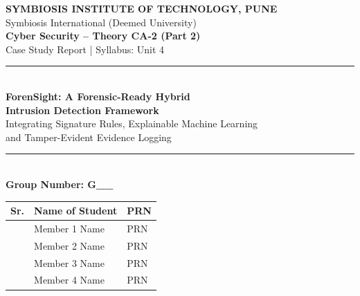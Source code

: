 \documentclass[12pt,a4paper,oneside]{article}
\newcommand{\groupno}{G\_\_}            %
\newcommand{\memberA}{Member 1 Name}    \newcommand{\prnA}{PRN}
\newcommand{\memberB}{Member 2 Name}    \newcommand{\prnB}{PRN}
\newcommand{\memberC}{Member 3 Name}    \newcommand{\prnC}{PRN}
\newcommand{\memberD}{Member 4 Name}    \newcommand{\prnD}{PRN}
\begin{document}
\begin{titlepage}
\thispagestyle{empty}
\begin{tcolorbox}[enhanced,colback=white,colframe=rblue,boxrule=1.6pt,arc=0pt,height=\textheight,valign=top,left=14pt,right=14pt,top=10pt]
\centering
{\large\bfseries\color{rblue} SYMBIOSIS INSTITUTE OF TECHNOLOGY, PUNE}\\[2pt]
{\normalsize Symbiosis International (Deemed University)}\\[14pt]
{\large\bfseries Cyber Security -- Theory CA-2 (Part 2)}\\[2pt]
{\normalsize Case Study Report \;|\; Syllabus: Unit 4}\\[16pt]
{\color{rblue}\rule{0.9\linewidth}{1pt}}\\[10pt]
{\LARGE\bfseries\color{rblue} ForenSight: A Forensic-Ready Hybrid\\[4pt] Intrusion Detection Framework}\\[10pt]
{\large Integrating Signature Rules, Explainable Machine Learning\\ and Tamper-Evident Evidence Logging}\\[10pt]
{\color{rblue}\rule{0.9\linewidth}{1pt}}\\[18pt]

{\Large\bfseries Group Number: \color{rblue}\groupno}\\[16pt]

\begin{tabular}{>{\centering\arraybackslash}p{1.2cm} >{\raggedright\arraybackslash}p{7.2cm} >{\centering\arraybackslash}p{4.2cm}}
\toprule
\textbf{\textcolor{rblue}{Sr.}} & \textbf{\textcolor{rblue}{Name of Student}} & \textbf{\textcolor{rblue}{PRN}} \\ \midrule
1 & \memberA & \prnA \\
2 & \memberB & \prnB \\
3 & \memberC & \prnC \\
4 & \memberD & \prnD \\ \bottomrule
\end{tabular}\\[18pt]


\end{tcolorbox}
\end{titlepage}
\end{document}
